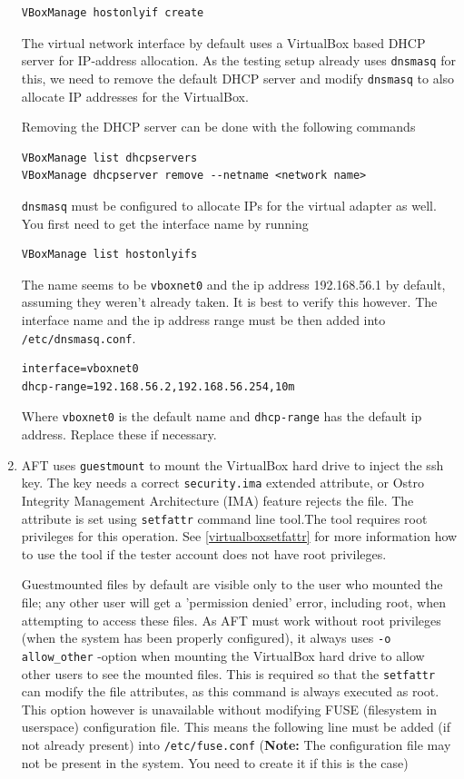 \documentclass[a4paper,11pt]{article}
\newcommand{\note}{\textbf{Note: }}
\newcommand{\cmd}[1]{\texttt{#1}}
\begin{document}
\begin{enumerate}
\begin{lstlisting}
VBoxManage hostonlyif create
\end{lstlisting}

The virtual network interface by default uses a VirtualBox based DHCP server for IP-address allocation. As the testing setup already uses \cmd{dnsmasq} for this, we need to remove the default DHCP server and modify \cmd{dnsmasq} to also allocate IP addresses for the VirtualBox.

Removing the DHCP server can be done with the following commands

\begin{lstlisting}
VBoxManage list dhcpservers
VBoxManage dhcpserver remove --netname <network name>
\end{lstlisting}

\cmd{dnsmasq} must be configured to allocate IPs for the virtual adapter as well. You first need to get the interface name by running

\begin{lstlisting}
VBoxManage list hostonlyifs
\end{lstlisting}

The name seems to be \cmd{vboxnet0} and the ip address 192.168.56.1 by default, assuming they weren't already taken. It is best to verify this however. The interface name and the ip address range must be then added into \cmd{/etc/dnsmasq.conf}. 

\begin{lstlisting}
interface=vboxnet0
dhcp-range=192.168.56.2,192.168.56.254,10m
\end{lstlisting}

Where \cmd{vboxnet0} is the default name and \cmd{dhcp-range} has the default ip address. Replace these if necessary.

\item
AFT uses \cmd{guestmount} to mount the VirtualBox hard drive to inject the ssh key. The key needs a correct \cmd{security.ima} extended attribute, or Ostro Integrity Management Architecture (IMA) feature rejects the file. The attribute is set using \cmd{setfattr} command line tool.The tool requires root privileges for this operation. See \ref{virtualboxsetfattr} for more information how to use the tool if the tester account does not have root privileges.

Guestmounted files by default are visible only to the user who mounted the file; any other user will get a 'permission denied' error, including root, when attempting to access these files. As AFT must work without root privileges (when the system has been properly configured), it always uses \cmd{-o allow\_other} -option when mounting the VirtualBox hard drive to allow other users to see the mounted files. This is required so that the \cmd{setfattr} can modify the file attributes, as this command is always executed as root. This option however is unavailable without modifying FUSE (filesystem in userspace) configuration file. This means the following line must be added (if not already present) into \cmd{/etc/fuse.conf} (\note The configuration file may not be present in the system. You need to create it if this is the case)


\end{enumerate}
\end{document}

